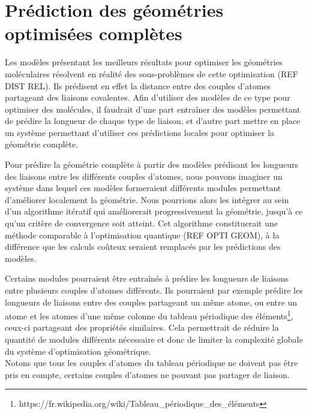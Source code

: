 \section{Prédiction des géométries optimisées complètes}

\par Les modèles présentant les meilleurs résultats pour optimiser les géométries moléculaires résolvent en réalité des sous-problèmes de cette optimisation (REF DIST REL). Ils prédisent en effet la distance entre des couples d'atomes partageant des liaisons covalentes. Afin d'utiliser des modèles de ce type pour optimiser des molécules, il faudrait d'une part entraîner des modèles permettant de prédire la longueur de chaque type de liaison, et d'autre part mettre en place un système permettant d'utiliser ces prédictions locales pour optimiser la géométrie complète.\\


\par Pour prédire la géométrie complète à partir des modèles prédisant les longueurs des liaisons entre les différents couples d'atomes, nous pouvons imaginer un système dans lequel ces modèles formeraient différents modules permettant d'améliorer localement la géométrie. Nous pourrions alors les intégrer au sein d'un algorithme itératif qui améliorerait progressivement la géométrie, jusqu'à ce qu'un critère de convergence soit atteint. Cet algorithme constituerait une méthode comparable à l'optimisation quantique (REF OPTI GEOM), à la différence que les calculs coûteux seraient remplacés par les prédictions des modèles.\\

\par Certains modules pourraient être entraînés à prédire les longueurs de liaisons entre plusieurs couples d'atomes différents. Ils pourraient par exemple prédire les longueurs de liaisons entre des couples partageant un même atome, ou entre un atome et les atomes d'une même colonne du tableau périodique des éléments\footnote{https://fr.wikipedia.org/wiki/Tableau\_périodique\_des\_éléments}, ceux-ci partageant des propriétés similaires. Cela permettrait de réduire la quantité de modules différents nécessaire et donc de limiter la complexité globale du système d'optimisation géométrique.\\
Notons que tous les couples d'atomes du tableau périodique ne doivent pas être pris en compte, certains couples d'atomes ne pouvant pas partager de liaison.\\


